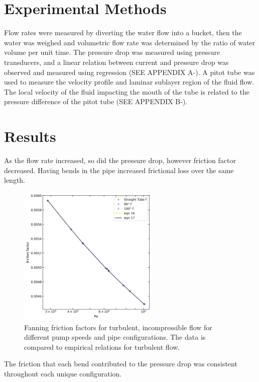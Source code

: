 \documentclass{article}
\begin{document}
\section*{Experimental Methods}

 Flow rates were measured by diverting the water flow into a bucket, then the water was weighed and volumetric flow rate was determined by the ratio of water volume per unit time. The pressure drop was measured using pressure transducers, and a linear relation between current and pressure drop was observed and measured using regression (SEE APPENDIX A-). A pitot tube was used to measure the velocity profile and laminar sublayer region of the fluid flow. The local velocity of the fluid impacting the mouth of the tube is related to the pressure difference of the pitot tube (SEE APPENDIX B-).

\section*{Results}

As the flow rate increased, so did the pressure drop, however friction factor decreased. Having bends in the pipe increased frictional loss over the same length.  

\begin{figure}[H]
\centering
\includegraphics[width=0.6\textwidth]{images/1_plot.png}
\caption{\label{fig2}Fanning friction factors for turbulent, incompressible flow for different pump speeds and pipe configurations. The data is compared to empirical relations for turbulent flow.}
\end{figure}

The friction that each bend contributed to the pressure drop was consistent throughout each unique configuration.
\end{document}
